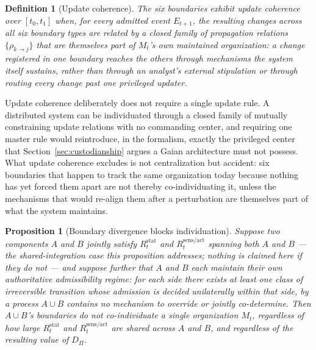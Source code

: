 \documentclass[11pt]{article}
\newtheorem{definition}{Definition}
\newtheorem{proposition}{Proposition}
\begin{document}
\begin{definition}[Update coherence]
The six boundaries exhibit \emph{update coherence} over $[t_0,t_1]$ when, for every admitted event $E_{t+1}$, the resulting changes across all six boundary types are related by a closed family of propagation relations $\{\rho_{k\to j}\}$ that are themselves part of $M_t$'s own maintained organization: a change registered in one boundary reaches the others through mechanisms the system itself sustains, rather than through an analyst's external stipulation or through routing every change past one privileged updater.
\end{definition}

Update coherence deliberately does not require a single update rule. A distributed system can be individuated through a closed family of mutually constraining update relations with no commanding center, and requiring one master rule would reintroduce, in the formalism, exactly the privileged center that Section~\ref{sec:custodianship} argues a Gaian architecture must not possess. What update coherence excludes is not centralization but accident: six boundaries that happen to track the same organization today because nothing has yet forced them apart are not thereby co-individuating it, unless the mechanisms that would re-align them after a perturbation are themselves part of what the system maintains.

\begin{proposition}[Boundary divergence blocks individuation]
\label{prop:federation}
Suppose two components $A$ and $B$ jointly satisfy $R^{\mathrm{stat}}_t$ and $R^{\mathrm{sens/act}}_t$ spanning both $A$ and $B$ --- the shared-integration case this proposition addresses; nothing is claimed here if they do not --- and suppose further that $A$ and $B$ each maintain their own authoritative admissibility regime: for each side there exists at least one class of irreversible transition whose admission is decided unilaterally within that side, by a process $A\cup B$ contains no mechanism to override or jointly co-determine. Then $A\cup B$'s boundaries do not co-individuate a single organization $M_t$, regardless of how large $R^{\mathrm{stat}}_t$ and $R^{\mathrm{sens/act}}_t$ are shared across $A$ and $B$, and regardless of the resulting value of $D_\Pi$.
\end{proposition}
\end{document}
